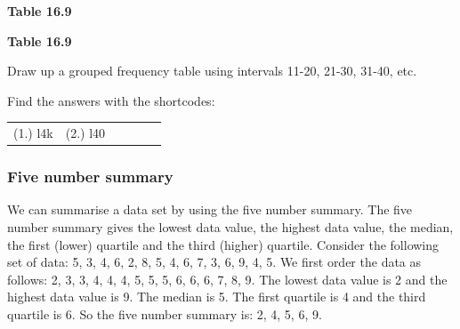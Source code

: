 \begin{description}[noitemsep]
\begin{description}[noitemsep]
\begin{enumerate}[noitemsep, label=\textbf{\arabic*}. ]
\begin{table}[H]
\begin{center}
\begin{xtabular}[t]{|l|l|l|l|l|l|l|l|l|l|}
    \end{xtabular}
      \end{center}
    \begin{center}{\small\bfseries Table 16.9}\end{center}
    \begin{caption}{\small\bfseries Table 16.9}\end{caption}
\end{table}
    \par
   Draw up a grouped frequency table using intervals 11-20, 21-30, 31-40, etc.\newline
\end{enumerate}
  \label{m39403**end}
\par {} Find the answers with the shortcodes:
 \par \begin{tabular}[h]{cccccc}
 (1.) l4k  &  (2.) l40  & \end{tabular}
      \label{m39400*eip-435}
            \subsubsection{ Five number summary}
            \nopagebreak
            \label{m39400*eip-839}We can summarise a data set by using the five number summary. The five number summary gives the lowest data value, the highest data value, the median, the first (lower) quartile and the third (higher) quartile. Consider the following set of data: 5, 3, 4, 6, 2, 8, 5, 4, 6, 7, 3, 6, 9, 4, 5. We first order the data as follows: 2, 3, 3, 4, 4, 4, 5, 5, 5, 6, 6, 6, 7, 8, 9. The lowest data value is 2 and the highest data value is 9. The median is 5. The first quartile is 4 and the third quartile is 6. So the five number summary is: 2, 4, 5, 6, 9. 
\par \label{m39400*eip-504}

\end{description}
\end{description}
